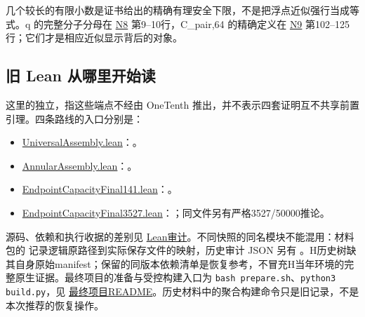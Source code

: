 几个较长的有限小数是证书给出的精确有理安全下限，不是把浮点近似强行当成等式。q 的完整分子分母在 \href{https://github.com/subfish-zhou/star-shaped-kakeya-lean/blob/6432d8eb33cc2093ed5ca1f5e63390e4bf065fd0/history-sources/N8-README.md}{N8} 第9--10行，C\_pair,64 的精确定义在 \href{https://github.com/subfish-zhou/star-shaped-kakeya-lean/blob/6432d8eb33cc2093ed5ca1f5e63390e4bf065fd0/history-sources/N9-THEOREM.md}{N9} 第102--125行；它们才是相应近似显示背后的对象。

\subsection{旧 Lean 从哪里开始读}\label{ux65e7-lean-ux4eceux54eaux91ccux5f00ux59cbux8bfb}

这里的独立，指这些端点不经由 OneTenth 推出，并不表示四套证明互不共享前置引理。四条路线的入口分别是：

\begin{itemize}
\tightlist
\item
  \href{https://github.com/subfish-zhou/star-shaped-kakeya-lean/blob/6432d8eb33cc2093ed5ca1f5e63390e4bf065fd0/historical-lean-2026-08-04/StarKakeyaLower/UniversalAssembly.lean}{UniversalAssembly.lean}：。
\item
  \href{https://github.com/subfish-zhou/star-shaped-kakeya-lean/blob/6432d8eb33cc2093ed5ca1f5e63390e4bf065fd0/historical-lean-2026-08-04/StarKakeyaLower/AnnularAssembly.lean}{AnnularAssembly.lean}：。
\item
  \href{https://github.com/subfish-zhou/star-shaped-kakeya-lean/blob/6432d8eb33cc2093ed5ca1f5e63390e4bf065fd0/historical-lean-2026-08-04/StarKakeyaLower/EndpointCapacityFinal141.lean}{EndpointCapacityFinal141.lean}：。
\item
  \href{https://github.com/subfish-zhou/star-shaped-kakeya-lean/blob/6432d8eb33cc2093ed5ca1f5e63390e4bf065fd0/historical-lean-2026-08-04/StarKakeyaLower/EndpointCapacityFinal3527.lean}{EndpointCapacityFinal3527.lean}：；同文件另有严格3527/50000推论。
\end{itemize}

源码、依赖和执行收据的差别见 \href{https://github.com/subfish-zhou/star-shaped-kakeya-lean/blob/6432d8eb33cc2093ed5ca1f5e63390e4bf065fd0/audits/historical-lean-audit.md}{Lean审计}。不同快照的同名模块不能混用：材料包的  记录逻辑原路径到实际保存文件的映射，历史审计 JSON 另有 。H历史树缺其自身原始manifest；保留的同版本依赖清单是恢复参考，不冒充H当年环境的完整原生证据。最终项目的准备与受控构建入口为 \texttt{bash prepare.sh}、\texttt{python3 build.py}，见 \href{https://github.com/subfish-zhou/star-shaped-kakeya-lean/blob/6432d8eb33cc2093ed5ca1f5e63390e4bf065fd0/final-public/README.md}{最终项目README}。历史材料中的聚合构建命令只是旧记录，不是本次推荐的恢复操作。

